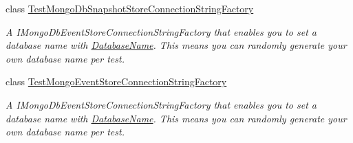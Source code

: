 \begin{DoxyCompactItemize}
class \hyperlink{classCqrs_1_1MongoDB_1_1Tests_1_1Integration_1_1TestMongoDbSnapshotStoreConnectionStringFactory}{Test\+Mongo\+Db\+Snapshot\+Store\+Connection\+String\+Factory}
\begin{DoxyCompactList}\small\item\em A I\+Mongo\+Db\+Event\+Store\+Connection\+String\+Factory that enables you to set a database name with \hyperlink{classCqrs_1_1MongoDB_1_1Tests_1_1Integration_1_1TestMongoDbSnapshotStoreConnectionStringFactory_a7c9e2a69f78de292d276cca3ee740394_a7c9e2a69f78de292d276cca3ee740394}{Database\+Name}. This means you can randomly generate your own database name per test. \end{DoxyCompactList}\item 
class \hyperlink{classCqrs_1_1MongoDB_1_1Tests_1_1Integration_1_1TestMongoEventStoreConnectionStringFactory}{Test\+Mongo\+Event\+Store\+Connection\+String\+Factory}
\begin{DoxyCompactList}\small\item\em A I\+Mongo\+Db\+Event\+Store\+Connection\+String\+Factory that enables you to set a database name with \hyperlink{classCqrs_1_1MongoDB_1_1Tests_1_1Integration_1_1TestMongoEventStoreConnectionStringFactory_a647bfdbf4eef2cffe60f86e3ac01efac_a647bfdbf4eef2cffe60f86e3ac01efac}{Database\+Name}. This means you can randomly generate your own database name per test. \end{DoxyCompactList}\end{DoxyCompactItemize}
